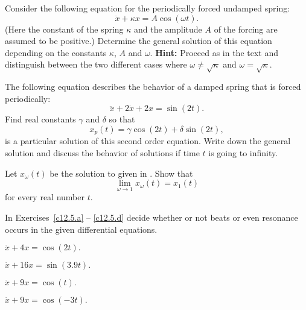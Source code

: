 \EXER

\TEXER


\begin{exercise} \label{c12.5.1}
Consider the following equation for the periodically forced
undamped spring:
\[
\ddot x + \kappa x = A\cos(\omega t).
\]
(Here the constant of the spring $\kappa$ and the amplitude $A$ of the
forcing are assumed to be positive.)  Determine the general solution of
this equation depending on the constants $\kappa$, $A$ and $\omega $.
{\bf Hint:} Proceed as in the text and distinguish between the two
different cases where $\omega \not=\sqrt{\kappa}$ and 
$\omega =\sqrt{\kappa}$.
\end{exercise}

\begin{exercise} \label{c12.5.2}
The following equation describes the behavior of a damped 
spring that is 
forced periodically:
\[
\ddot x + 2\dot x + 2x = \sin(2t).
\]
Find real constants $\gamma$ and $\delta$ so that
\[
x_p(t) = \gamma \cos(2t)+ \delta \sin(2t),
\]
is a particular solution of this second order equation.  Write down the
general solution and discuss the behavior of solutions if time $t$
is going to infinity.
\end{exercise}

\begin{exercise} \label{c12.5.3}
Let $x_\omega(t)$ be the solution to  given in 
.  Show that 
\[
\lim_{\omega\to 1}x_\omega(t) = x_1(t)
\]
for every real number $t$.
\end{exercise} 

\noindent In Exercises~\ref{c12.5.a} -- \ref{c12.5.d} decide whether or not
beats or even resonance occurs in the given differential equations.
\begin{exercise} \label{c12.5.a}
$\ddot{x} + 4x = \cos(2t).$
\end{exercise}
\begin{exercise} \label{c12.5.b}
$\ddot{x} + 16x = \sin(3.9 t).$
\end{exercise}
\begin{exercise} \label{c12.5.c}
$\ddot{x} + 9x = \cos(t).$
\end{exercise}
\begin{exercise} \label{c12.5.d}
$\ddot{x} + 9x = \cos(-3t).$
\end{exercise}

